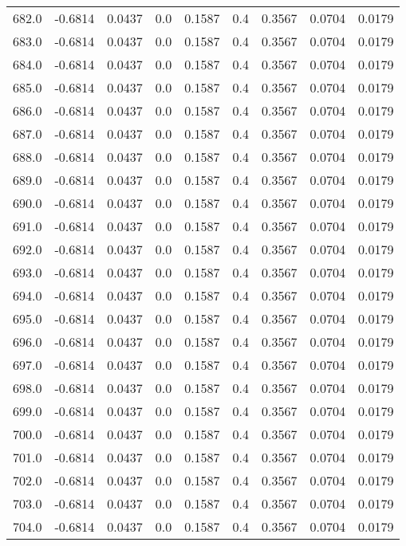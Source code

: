\begin{longtable}{lrrrrrrrr}
682.0 & -0.6814 & 0.0437 & 0.0 & 0.1587 & 0.4 & 0.3567 & 0.0704 & 0.0179 \\
683.0 & -0.6814 & 0.0437 & 0.0 & 0.1587 & 0.4 & 0.3567 & 0.0704 & 0.0179 \\
684.0 & -0.6814 & 0.0437 & 0.0 & 0.1587 & 0.4 & 0.3567 & 0.0704 & 0.0179 \\
685.0 & -0.6814 & 0.0437 & 0.0 & 0.1587 & 0.4 & 0.3567 & 0.0704 & 0.0179 \\
686.0 & -0.6814 & 0.0437 & 0.0 & 0.1587 & 0.4 & 0.3567 & 0.0704 & 0.0179 \\
687.0 & -0.6814 & 0.0437 & 0.0 & 0.1587 & 0.4 & 0.3567 & 0.0704 & 0.0179 \\
688.0 & -0.6814 & 0.0437 & 0.0 & 0.1587 & 0.4 & 0.3567 & 0.0704 & 0.0179 \\
689.0 & -0.6814 & 0.0437 & 0.0 & 0.1587 & 0.4 & 0.3567 & 0.0704 & 0.0179 \\
690.0 & -0.6814 & 0.0437 & 0.0 & 0.1587 & 0.4 & 0.3567 & 0.0704 & 0.0179 \\
691.0 & -0.6814 & 0.0437 & 0.0 & 0.1587 & 0.4 & 0.3567 & 0.0704 & 0.0179 \\
692.0 & -0.6814 & 0.0437 & 0.0 & 0.1587 & 0.4 & 0.3567 & 0.0704 & 0.0179 \\
693.0 & -0.6814 & 0.0437 & 0.0 & 0.1587 & 0.4 & 0.3567 & 0.0704 & 0.0179 \\
694.0 & -0.6814 & 0.0437 & 0.0 & 0.1587 & 0.4 & 0.3567 & 0.0704 & 0.0179 \\
695.0 & -0.6814 & 0.0437 & 0.0 & 0.1587 & 0.4 & 0.3567 & 0.0704 & 0.0179 \\
696.0 & -0.6814 & 0.0437 & 0.0 & 0.1587 & 0.4 & 0.3567 & 0.0704 & 0.0179 \\
697.0 & -0.6814 & 0.0437 & 0.0 & 0.1587 & 0.4 & 0.3567 & 0.0704 & 0.0179 \\
698.0 & -0.6814 & 0.0437 & 0.0 & 0.1587 & 0.4 & 0.3567 & 0.0704 & 0.0179 \\
699.0 & -0.6814 & 0.0437 & 0.0 & 0.1587 & 0.4 & 0.3567 & 0.0704 & 0.0179 \\
700.0 & -0.6814 & 0.0437 & 0.0 & 0.1587 & 0.4 & 0.3567 & 0.0704 & 0.0179 \\
701.0 & -0.6814 & 0.0437 & 0.0 & 0.1587 & 0.4 & 0.3567 & 0.0704 & 0.0179 \\
702.0 & -0.6814 & 0.0437 & 0.0 & 0.1587 & 0.4 & 0.3567 & 0.0704 & 0.0179 \\
703.0 & -0.6814 & 0.0437 & 0.0 & 0.1587 & 0.4 & 0.3567 & 0.0704 & 0.0179 \\
704.0 & -0.6814 & 0.0437 & 0.0 & 0.1587 & 0.4 & 0.3567 & 0.0704 & 0.0179 \\

\end{longtable}
